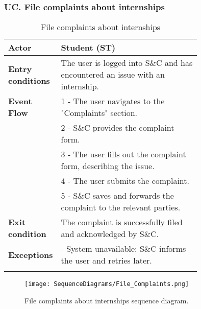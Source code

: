\subsubsection*{UC\cuc . File complaints about internships}
\begin{center}
    \begin{longtable}{|l|p{0.75\linewidth}|}
        \hline
        \textbf{Actor}            & Student (ST) \\
        \hline
        \textbf{Entry conditions} & The user is logged into S\&C and has encountered an issue with an internship. \\
        \hline
        \textbf{Event Flow}       & 1 - The user navigates to the "Complaints" section. \\
        & 2 - S\&C provides the complaint form. \\
        & 3 - The user fills out the complaint form, describing the issue. \\
        & 4 - The user submits the complaint. \\
        & 5 - S\&C saves and forwards the complaint to the relevant parties. \\
        \hline
        \textbf{Exit condition}   & The complaint is successfully filed and acknowledged by S\&C. \\       
        \hline
        \textbf{Exceptions}       & - System unavailable: S\&C informs the user and retries later. \\
        \hline
        \caption{File complaints about internships}
        \label{tab:file_complaints_usecase}
    \end{longtable}
\end{center}

\begin{figure}[H]
    \begin{center}
        \texttt{[image: SequenceDiagrams/File\_Complaints.png]}
        \caption{File complaints about internships sequence diagram.}
        \label{fig:file_complaints_seqd}%
    \end{center}
\end{figure}

